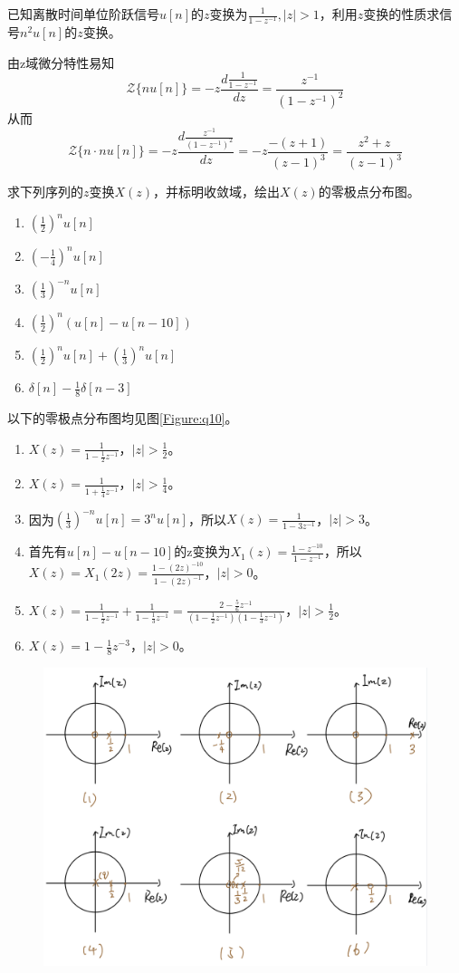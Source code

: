 \documentclass[answers]{exam}  %
\begin{document}
\begin{questions}
\question 已知离散时间单位阶跃信号$u[n]$的$z$变换为$\frac{1}{1-z^{-1}},|z|>1$，利用$z$变换的性质求信号$n^2u[n]$的$z$变换。
\begin{solution}
由z域微分特性易知$$\mathcal{Z}\{nu[n]\}=-z\frac{d\frac{1}{1-z^{-1}}}{dz}=\frac{z^{-1}}{(1-z^{-1})^2}$$从而$$\mathcal{Z}\{n\cdot nu[n]\}=-z\frac{d\frac{z^{-1}}{(1-z^{-1})^2}}{dz}=-z\frac{-(z+1)}{(z-1)^3}=\frac{z^2+z}{(z-1)^3}$$ 
\end{solution}

\question 求下列序列的$z$变换$X(z)$，并标明收敛域，绘出$X(z)$的零极点分布图。
\begin{enumerate}[(1)]
\item $\left(\frac{1}{2}\right)^nu[n]$
\item $\left(-\frac{1}{4}\right)^nu[n]$
\item $\left(\frac{1}{3}\right)^{-n}u[n]$
\item $\left(\frac{1}{2}\right)^n(u[n]-u[n-10])$
\item $\left(\frac{1}{2}\right)^nu[n]+\left(\frac{1}{3}\right)^nu[n]$
\item $\delta[n]-\frac{1}{8}\delta[n-3]$
\end{enumerate}
\begin{solution}以下的零极点分布图均见图\ref{Figure:q10}。
\begin{enumerate}[(1)]
	\item $X(z)=\frac{1}{1-\frac{1}{2}z^{-1}}$，$|z|>\frac{1}{2}$。
	\item $X(z)=\frac{1}{1+\frac{1}{4}z^{-1}}$，$|z|>\frac{1}{4}$。
	\item 因为$(\frac{1}{3})^{-n}u[n]=3^{n}u[n]$，所以$X(z)=\frac{1}{1-3z^{-1}}$，$|z|>3$。
	\item 首先有$u[n]-u[n-10]$的z变换为$X_1(z)=\frac{1-z^{-10}}{1-z^{-1}}$，所以$X(z)=X_1(2z)=\frac{1-(2z)^{-10}}{1-(2z)^{-1}}$，$|z|>0$。
	\item $X(z)=\frac{1}{1-\frac{1}{2}z^{-1}}+\frac{1}{1-\frac{1}{3}z^{-1}}=\frac{2-\frac{5}{6}z^{-1}}{(1-\frac{1}{2}z^{-1})(1-\frac{1}{3}z^{-1})}$，$|z|>\frac{1}{2}$。
	\item $X(z)=1-\frac{1}{8}z^{-3}$，$|z|>0$。
\end{enumerate}
\end{solution}
\begin{figure}[!h]
	\centering
	\includegraphics[width=0.9\linewidth]{pics/q10.png}

\end{figure}
\end{questions}
\end{document}
